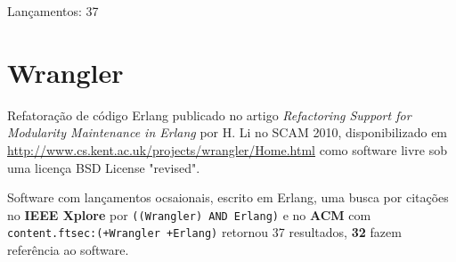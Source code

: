 Lançamentos: 37

\section{Wrangler}

Refatoração de código Erlang
publicado no artigo {\it Refactoring Support for Modularity Maintenance in Erlang}
por H. Li
no SCAM 2010,
disponibilizado em \url{http://www.cs.kent.ac.uk/projects/wrangler/Home.html}
como software livre
sob uma licença BSD License "revised".

Software com lançamentos ocsaionais,
escrito em Erlang,
uma busca por citações no {\bf IEEE Xplore} por
\texttt{((Wrangler) AND Erlang)}
e no {\bf ACM} com
\texttt{content.ftsec:(+Wrangler +Erlang)}
retornou
37 resultados,
{\bf 32} fazem referência ao software.

